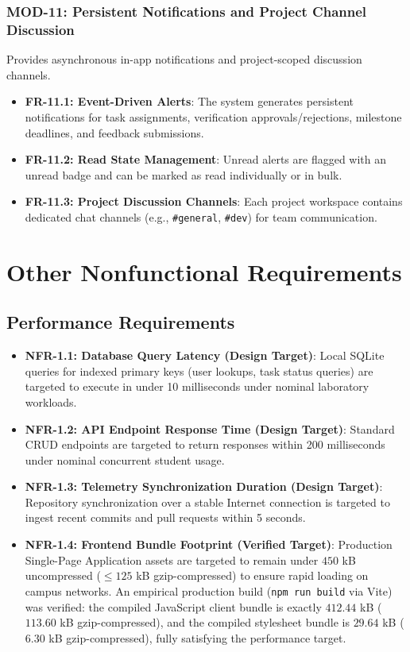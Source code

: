 \documentclass{scrreprt}
\begin{document}
\subsection{MOD-11: Persistent Notifications and Project Channel Discussion}
Provides asynchronous in-app notifications and project-scoped discussion channels.
\begin{itemize}
    \item \textbf{FR-11.1: Event-Driven Alerts}: The system generates persistent notifications for task assignments, verification approvals/rejections, milestone deadlines, and feedback submissions.
    \item \textbf{FR-11.2: Read State Management}: Unread alerts are flagged with an unread badge and can be marked as read individually or in bulk.
    \item \textbf{FR-11.3: Project Discussion Channels}: Each project workspace contains dedicated chat channels (e.g., \texttt{\#general}, \texttt{\#dev}) for team communication.
\end{itemize}


\chapter{Other Nonfunctional Requirements}\label{chap:nonfunctional_requirements}

\section{Performance Requirements}\label{sec:performance}
\begin{itemize}
    \item \textbf{NFR-1.1: Database Query Latency (Design Target)}: Local SQLite queries for indexed primary keys (user lookups, task status queries) are targeted to execute in under 10 milliseconds under nominal laboratory workloads.
    \item \textbf{NFR-1.2: API Endpoint Response Time (Design Target)}: Standard CRUD endpoints are targeted to return responses within 200 milliseconds under nominal concurrent student usage.
    \item \textbf{NFR-1.3: Telemetry Synchronization Duration (Design Target)}: Repository synchronization over a stable Internet connection is targeted to ingest recent commits and pull requests within 5 seconds.
    \item \textbf{NFR-1.4: Frontend Bundle Footprint (Verified Target)}: Production Single-Page Application assets are targeted to remain under $450$ kB uncompressed ($\le 125$ kB gzip-compressed) to ensure rapid loading on campus networks. An empirical production build (\texttt{npm run build} via Vite) was verified: the compiled JavaScript client bundle is exactly $412.44$ kB ($113.60$ kB gzip-compressed), and the compiled stylesheet bundle is $29.64$ kB ($6.30$ kB gzip-compressed), fully satisfying the performance target.
\end{itemize}
\end{document}

